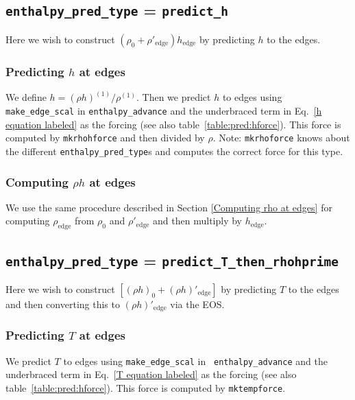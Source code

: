 \subsection{{\tt enthalpy\_pred\_type} = {\tt predict\_h}}

Here we wish to construct $\left (\rho_0 + \rho'_\mathrm{edge} \right
) h_\mathrm{edge}$ by predicting $h$ to the edges.

\subsubsection{Predicting $h$ at edges}

We define $h = (\rho h)^{(1)}/\rho^{(1)}$.  Then we predict $h$ to edges
using {\tt make\_edge\_scal} in {\tt enthalpy\_advance} and the
underbraced term in Eq.~\ref{h equation labeled} as the forcing (see
also table~\ref{table:pred:hforce}).  This force is computed by
{\tt mkrhohforce} and then divided by $\rho$.  Note: {\tt mkrhoforce}
knows about the different {\tt enthalpy\_pred\_type}s and computes
the correct force for this type.

\subsubsection{Computing $\rho h$ at edges}

We use the same procedure described in Section \ref{Computing rho at
  edges} for computing $\rho_\mathrm{edge}$ from $\rho_0$ and
$\rho'_\mathrm{edge}$ and then multiply by $h_\mathrm{edge}$.




\subsection{{\tt enthalpy\_pred\_type} = {\tt predict\_T\_then\_rhohprime}}

Here we wish to construct $\left [ (\rho h)_0 + (\rho
  h)'_\mathrm{edge} \right ]$ by predicting $T$ to the edges and then
converting this to $(\rho h)'_\mathrm{edge}$ via the EOS.

\subsubsection{Predicting $T$ at edges}

We predict $T$ to edges using {\tt make\_edge\_scal} in {\tt
  enthalpy\_advance} and the underbraced term in Eq.~\ref{T equation
  labeled} as the forcing (see also table~\ref{table:pred:hforce}).
This force is computed by {\tt mktempforce}.

